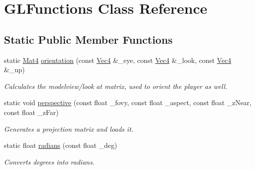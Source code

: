 \hypertarget{classGLFunctions}{
\section{GLFunctions Class Reference}
\label{classGLFunctions}
}
\subsection*{Static Public Member Functions}
\begin{DoxyCompactItemize}
\item 
static \hyperlink{classMat4}{Mat4} \hyperlink{classGLFunctions_ad495c3d29a2c1215a57817cf57d25f73}{orientation} (const \hyperlink{classVec4}{Vec4} \&\_\-eye, const \hyperlink{classVec4}{Vec4} \&\_\-look, const \hyperlink{classVec4}{Vec4} \&\_\-up)
\begin{DoxyCompactList}\small\item\em Calculates the modelview/look at matrix, used to orient the player as well. \item\end{DoxyCompactList}\item 
static void \hyperlink{classGLFunctions_a85268eb7e53538a0e00da8e8f66ca3d1}{perspective} (const float \_\-fovy, const float \_\-aspect, const float \_\-zNear, const float \_\-zFar)
\begin{DoxyCompactList}\small\item\em Generates a projection matrix and loads it. \item\end{DoxyCompactList}\item 
static float \hyperlink{classGLFunctions_a408bdb911a650c5517d7fca5b2e29ac1}{radians} (const float \_\-deg)
\begin{DoxyCompactList}\small\item\em Converts degrees into radians. \item\end{DoxyCompactList}\end{DoxyCompactItemize}
